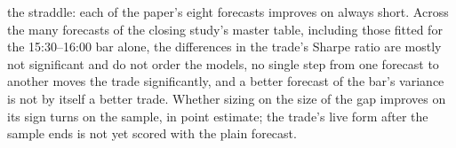 the straddle: each of the paper's eight forecasts improves on always short. Across the
many forecasts of the closing study's master table, including those fitted for the
15:30--16:00 bar alone, the differences in the trade's Sharpe ratio are mostly not
significant and do not order the models, no single step from one forecast to another
moves the trade significantly, and a better forecast of the bar's variance is not by
itself a better trade. Whether sizing on the size of the gap improves on its sign turns
on the sample, in point estimate; the trade's live form after the sample ends is not yet
scored with the plain forecast.

